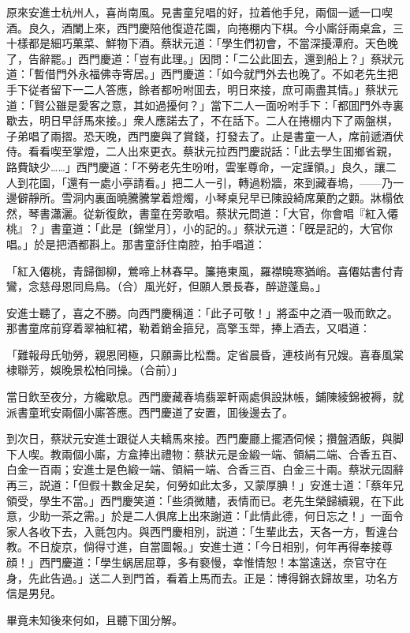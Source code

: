 原來安進士杭州人，喜尚南風。見書童兒唱的好，拉着他手兒，兩個一遞一口喫酒。良久，酒闌上來，西門慶陪他復遊花園，向捲棚内下棋。今小廝㧱兩桌盒，三十樣都是細巧菓菜、鮮物下酒。蔡狀元道：「學生們初會，不當深擾潭府。天色晚了，告辭罷。」西門慶道：「豈有此理。」因問：「二公此囬去，還到船上？」蔡狀元道：「暫借門外永福佛寺寄居。」西門慶道：「如今就門外去也晚了。不如老先生把手下従者留下一二人答應，餘者都吩咐囬去，明日來接，庶可兩盡其情。」蔡狀元道：「賢公雖是愛客之意，其如過擾何？」當下二人一面吩咐手下：「都囬門外寺裏歇去，明日早㧱馬來接。」衆人應諾去了，不在話下。二人在捲棚内下了兩盤棋，子弟唱了兩摺。恐天晚，西門慶與了賞錢，打發去了。止是書童一人，席前遞酒伏侍。看看喫至掌燈，二人出來更衣。蔡狀元拉西門慶説話：「此去學生囬鄉省親，路費缺少……」西門慶道：「不勞老先生吩咐，雲峯尊命，一定謹領。」良久，讓二人到花園，「還有一處小亭請看。」把二人一引，轉過粉牆，來到藏春塢，——乃一邊僻靜所。雪洞内裏面曉騰騰掌着燈燭，小琴桌兒早已陳設綺席菓酌之䫫。牀榻依然，琴書瀟灑。従新復飲，書童在旁歌唱。蔡狀元問道：「大官，你會唱『紅入僊桃』？」書童道：「此是〔錦堂月〕，小的記的。」蔡狀元道：「旣是記的，大官你唱。」於是把酒都斟上。那書童㧱住南腔，拍手唱道：

\begin{myquote}
「紅入僊桃，青歸御柳，鶯啼上林春早。簾捲東風，羅襟曉寒猶峭。喜僊姑書付青鸞，念慈母恩同烏鳥。{\marktext\small（合）}風光好，但願人景長春，醉遊蓬島。」
\end{myquote}

安進士聽了，喜之不勝。向西門慶稱道：「此子可敬！」將盃中之酒一吸而飲之。那書童席前穿着翠袖紅裙，勒着銷金箍兒，高擎玉斝，捧上酒去，又唱道：

\begin{myquote}
「難報母氏劬勞，親恩罔極，只願壽比松喬。定省晨昏，連枝尚有兄嫂。喜春風棠棣聯芳，娛晚景松柏同操。{\marktext\small（合前）}」
\end{myquote}

當日飲至夜分，方纔歇息。西門慶藏春塢翡翠軒兩處俱設牀帳，鋪陳綾錦被褥，就派書童玳安兩個小廝答應。西門慶道了安置，囬後邊去了。

到次日，蔡狀元安進士跟従人夫轎馬來接。西門慶廳上擺酒伺候；攢盤酒飯，與脚下人喫。教兩個小廝，方盒捧出禮物：蔡狀元是金緞一端、領絹二端、合香五百、白金一百兩；安進士是色緞一端、領絹一端、合香三百、白金三十兩。蔡狀元固辭再三，説道：「但假十數金足矣，何勞如此太多，又蒙厚腆！」安進士道：「蔡年兄領受，學生不當。」西門慶笑道：「些須微贐，表情而已。老先生榮歸續親，在下此意，少助一茶之需。」於是二人俱席上出來謝道：「此情此德，何日忘之！」一面令家人各收下去，入氈包内。與西門慶相別，説道：「生輩此去，天各一方，暫違台教。不日旋京，倘得寸進，自當圖報。」安進士道：「今日相别，何年再得奉接尊顔！」西門慶道：「學生蜗居屈尊，多有褻慢，幸惟情恕！本當遠送，奈官守在身，先此告過。」送二人到門首，看着上馬而去。正是：博得錦衣歸故里，功名方信是男兒。

畢竟未知後來何如，且聽下囬分解。

